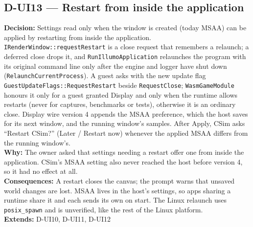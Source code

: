 \subsection*{D-UI13 --- Restart from inside the application}
\begin{decisionbox}[title={D-UI13 \quad 2026-09-25}]
\textbf{Decision:} Settings read only when the window is created (today
MSAA) can be applied by restarting from inside the application.
\texttt{IRenderWindow::requestRestart} is a close request that remembers a
relaunch; a deferred close drops it, and \texttt{RunIllumoApplication}
relaunches the program with its original command line only after the engine
and logger have shut down (\texttt{RelaunchCurrentProcess}). A guest asks with
the new update flag \texttt{GuestUpdateFlags::RequestRestart} beside
\texttt{RequestClose}; \texttt{WasmGameModule} honours it only for a guest
granted Display and only when the runtime allows restarts (never for
captures, benchmarks or tests), otherwise it is an ordinary close. Display
wire version 4 appends the MSAA preference, which the host saves for its next
window, and the running window's samples. After Apply, CSim asks ``Restart
CSim?'' (Later / Restart now) whenever the applied MSAA differs from the
running window's.\\
\textbf{Why:} The owner asked that settings needing a restart offer one from
inside the application. CSim's MSAA setting also never reached the host
before version 4, so it had no effect at all.\\
\textbf{Consequences:} A restart closes the canvas; the prompt warns that
unsaved world changes are lost. MSAA lives in the host's settings, so apps
sharing a runtime share it and each sends its own on start. The Linux
relaunch uses \texttt{posix\_spawn} and is unverified, like the rest of the
Linux platform.\\
\textbf{Extends:} D-UI10, D-UI11, D-UI12
\end{decisionbox}

